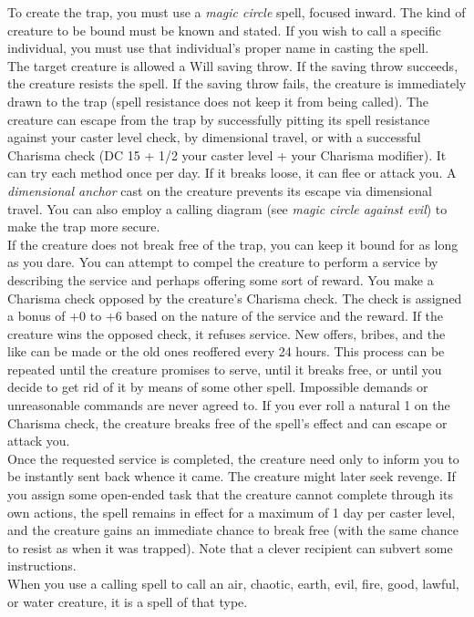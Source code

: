 To create the trap, you must use a \textit{magic circle }spell, focused inward. The kind of creature to be bound must be known and stated. If you wish to call a specific individual, you must use that individual's proper name in casting the spell.\\
The target creature is allowed a Will saving throw. If the saving throw succeeds, the creature resists the spell. If the saving throw fails, the creature is immediately drawn to the trap (spell resistance does not keep it from being called). The creature can escape from the trap by successfully pitting its spell resistance against your caster level check, by dimensional travel, or with a successful Charisma check (DC 15 + 1/2 your caster level + your Charisma modifier). It can try each method once per day. If it breaks loose, it can flee or attack you. A \textit{dimensional anchor }cast on the creature prevents its escape via dimensional travel. You can also employ a calling diagram (see \textit{magic circle against evil}) to make the trap more secure.\\
If the creature does not break free of the trap, you can keep it bound for as long as you dare. You can attempt to compel the creature to perform a service by describing the service and perhaps offering some sort of reward. You make a Charisma check opposed by the creature's Charisma check. The check is assigned a bonus of +0 to +6 based on the nature of the service and the reward. If the creature wins the opposed check, it refuses service. New offers, bribes, and the like can be made or the old ones reoffered every 24 hours. This process can be repeated until the creature promises to serve, until it breaks free, or until you decide to get rid of it by means of some other spell. Impossible demands or unreasonable commands are never agreed to. If you ever roll a natural 1 on the Charisma check, the creature breaks free of the spell's effect and can escape or attack you.\\
Once the requested service is completed, the creature need only to inform you to be instantly sent back whence it came. The creature might later seek revenge. If you assign some open-ended task that the creature cannot complete through its own actions, the spell remains in effect for a maximum of 1 day per caster level, and the creature gains an immediate chance to break free (with the same chance to resist as when it was trapped). Note that a clever recipient can subvert some instructions.\\
When you use a calling spell to call an air, chaotic, earth, evil, fire, good, lawful, or water creature, it is a spell of that type. \\
